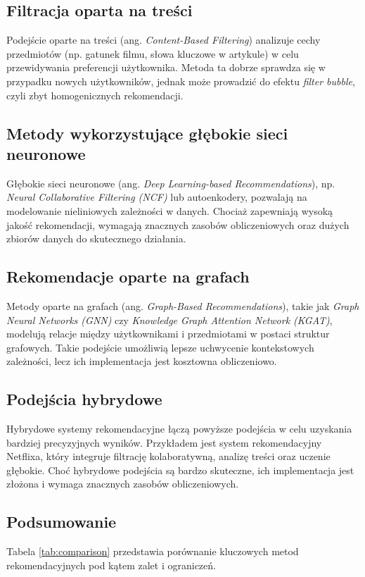 \documentclass[a4paper]{LTJournalArticle}
\begin{document}
\subsection{Filtracja oparta na treści}
Podejście oparte na treści (ang. \textit{Content-Based Filtering}) analizuje cechy przedmiotów (np. gatunek filmu, słowa kluczowe w artykule) w celu przewidywania preferencji użytkownika. Metoda ta dobrze sprawdza się w przypadku nowych użytkowników, jednak może prowadzić do efektu \textit{filter bubble}, czyli zbyt homogenicznych rekomendacji.

\subsection{Metody wykorzystujące głębokie sieci neuronowe}
Głębokie sieci neuronowe (ang. \textit{Deep Learning-based Recommendations}), np. \textit{Neural Collaborative Filtering (NCF)} lub autoenkodery, pozwalają na modelowanie nieliniowych zależności w danych. Chociaż zapewniają wysoką jakość rekomendacji, wymagają znacznych zasobów obliczeniowych oraz dużych zbiorów danych do skutecznego działania.

\subsection{Rekomendacje oparte na grafach}
Metody oparte na grafach (ang. \textit{Graph-Based Recommendations}), takie jak \textit{Graph Neural Networks (GNN)} czy \textit{Knowledge Graph Attention Network (KGAT)}, modelują relacje między użytkownikami i przedmiotami w postaci struktur grafowych. Takie podejście umożliwią lepsze uchwycenie kontekstowych zależności, lecz ich implementacja jest kosztowna obliczeniowo.

\subsection{Podejścia hybrydowe}
Hybrydowe systemy rekomendacyjne łączą powyższe podejścia w celu uzyskania bardziej precyzyjnych wyników. Przykładem jest system rekomendacyjny Netflixa, który integruje filtrację kolaboratywną, analizę treści oraz uczenie głębokie. Choć hybrydowe podejścia są bardzo skuteczne, ich implementacja jest złożona i wymaga znacznych zasobów obliczeniowych.

\subsection{Podsumowanie}
Tabela \ref{tab:comparison} przedstawia porównanie kluczowych metod rekomendacyjnych pod kątem zalet i ograniczeń.
\end{document}
